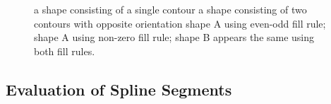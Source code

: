 \documentclass[11pt,a4paper,twoside]{article}
\begin{document}
\begin {figure}
	\centering
	\hspace{0.5cm}
	\hspace{0.5cm}
	\hspace{0.5cm}
	\hspace{0.5cm}
	\caption
		{ a shape consisting of a single contour
		 a shape consisting of two contours with opposite orientation
		 shape A using even-odd fill rule;
		 shape A using non-zero fill rule;
		 shape B appears the same using both fill rules.}
	\label {fig:winding}
\end {figure}

\subsection{Evaluation of Spline Segments}
\end{document}
